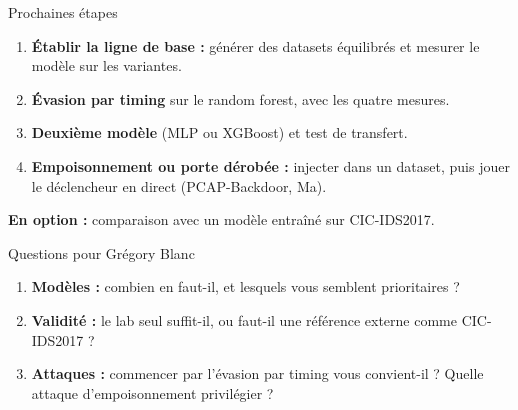 \documentclass[aspectratio=169,11pt,xcolor=table]{beamer}
\newcommand{\espacement}{\setlength{\itemsep}{.7em}}
\begin{document}
\begin{frame}{Prochaines étapes}
  \begin{enumerate}\espacement
    \item \textbf{Établir la ligne de base :} générer des datasets équilibrés et mesurer le modèle sur les variantes.
    \item \textbf{Évasion par timing} sur le random forest, avec les quatre mesures.
    \item \textbf{Deuxième modèle} (MLP ou XGBoost) et test de transfert.
    \item \textbf{Empoisonnement ou porte dérobée :} injecter dans un dataset, puis jouer le déclencheur en direct (PCAP-Backdoor, Ma).
  \end{enumerate}
  \vfill
  \textbf{En option :} comparaison avec un modèle entraîné sur CIC-IDS2017.
\end{frame}

\begin{frame}{Questions pour Grégory Blanc}
  \begin{enumerate}\espacement
    \item \textbf{Modèles :} combien en faut-il, et lesquels vous semblent prioritaires ?
    \item \textbf{Validité :} le lab seul suffit-il, ou faut-il une référence externe comme CIC-IDS2017 ?
    \item \textbf{Attaques :} commencer par l'évasion par timing vous convient-il ? Quelle attaque d'empoisonnement privilégier ?
  \end{enumerate}
\end{frame}
\end{document}
